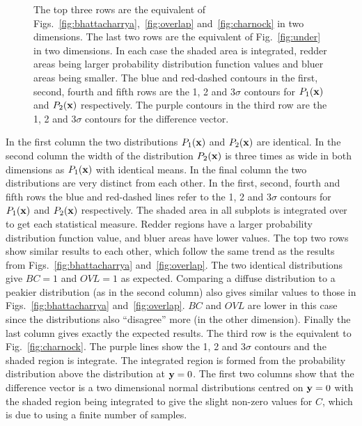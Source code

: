 \documentclass[twocolumn]{revtex4-1}
\begin{document}
\begin{figure}
        \caption{The top three rows are the equivalent of Figs.~\ref{fig:bhattacharrya},~\ref{fig:overlap} and~\ref{fig:charnock} in two dimensions.
                 The last two rows are the equivalent of Fig.~\ref{fig:under} in two dimensions.
                 In each case the shaded area is integrated, redder areas being larger probability distribution function values and bluer areas being smaller.
                 The blue and red-dashed contours in the first, second, fourth and fifth rows are the 1, 2 and 3$\sigma$ contours for $P_1({\bf x})$ and $P_2({\bf x})$ respectively.
                 The purple contours in the third row are the 1, 2 and 3$\sigma$ contours for the difference vector.}
        \label{fig:2D}
    \end{figure}
    In the first column the two distributions $P_1({\bf x})$ and $P_2({\bf x})$ are identical.
    In the second column the width of the distribution $P_2({\bf x})$ is three times as wide in both dimensions as $P_1({\bf x})$ with identical means.
    In the final column the two distributions are very distinct from each other.
    In the first, second, fourth and fifth rows the blue and red-dashed lines refer to the 1, 2 and 3$\sigma$ contours for $P_1({\bf x})$ and $P_2({\bf x})$ respectively.
    The shaded area in all subplots is integrated over to get each statistical measure.
    Redder regions have a larger probability distribution function value, and bluer areas have lower values.
    The top two rows show similar results to each other, which follow the same trend as the results from Figs.~\ref{fig:bhattacharrya} and~\ref{fig:overlap}.
    The two identical distributions give $BC = 1$ and $OVL = 1$ as expected.
    Comparing a diffuse distribution to a peakier distribution (as in the second column) also gives similar values to those in Figs.~\ref{fig:bhattacharrya} and~\ref{fig:overlap}.
    $BC$ and $OVL$ are lower in this case since the distributions also ``disagree'' more (in the other dimension).
    Finally the last column gives exactly the expected results.
    The third row is the equivalent to Fig.~\ref{fig:charnock}.
    The purple lines show the 1, 2 and 3$\sigma$ contours and the shaded region is integrate.
    The integrated region is formed from the probability distribution above the distribution at ${\bf y} = 0$.
    The first two columns show that the difference vector is a two dimensional normal distributions centred on ${\bf y}=0$ with the shaded region being integrated to give the slight non-zero values for $C$, which is due to using a finite number of samples.
\end{document}
